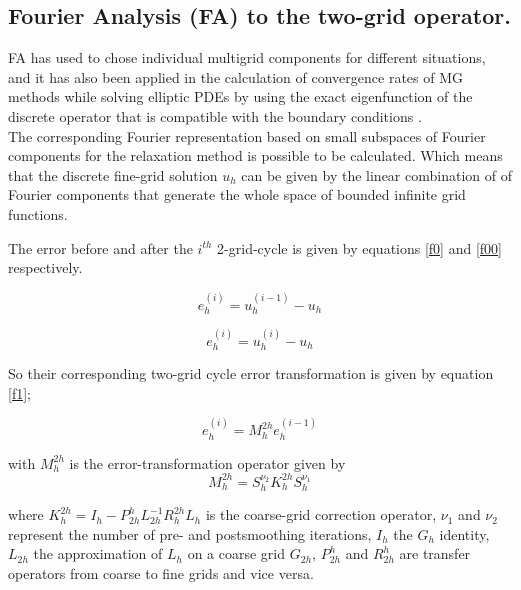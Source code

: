 \documentclass[12pt,a4paper]{article}
\begin{document}
	\subsection{Fourier Analysis (FA) to the two-grid operator.}
	
	FA has used to chose individual multigrid components for different situations, and it has also been applied in the calculation of convergence rates of MG methods while solving elliptic PDEs by using the exact eigenfunction of the discrete operator that is compatible with the boundary conditions \cite{kuo1989two}.\\
	
	\noindent  The corresponding Fourier representation  based on small subspaces of Fourier components for the relaxation method is possible to be calculated. Which means that the discrete fine-grid solution $u_{h}$  can be given by the linear combination of of Fourier components  that generate the whole space of bounded infinite grid functions.
	
	\noindent The error before and after the $i^{th}$ 2-grid-cycle is given by equations \eqref{f0} and \eqref{f00} respectively.
	
	\begin{equation}
		e_{h}^{(i)} = u_{h}^{(i-1)}  - u_{h} 
		\label{f0}
	\end{equation}

	\begin{equation}
	e_{h}^{(i)} = u_{h}^{(i)}  - u_{h} 
	\label{f00}
\end{equation}
	
	\noindent So their corresponding two-grid cycle error transformation is given by equation \eqref{f1};
	
	\begin{equation}
		e_{h}^{(i)} = M_{h}^{2h}e_{h}^{(i-1)}
		\label{f1}
	\end{equation}

	\noindent  with $M_{h}^{2h}$ is the error-transformation operator given by 
	\begin{equation}
	 M_{h}^{2h} = S_{h}^{\nu_{2}}K_{h}^{2h}S_{h}^{\nu_{1}} 
	\label{f2}
	\end{equation}
	
	 \noindent  where $K_{h}^{2h} = I_{h} - P_{2h}^{h}L_{2h}^{-1}R_{h}^{2h}L_{h}$ is the coarse-grid correction operator, $\nu_{1}$ and $\nu_{2}$ represent the number of pre- and postsmoothing iterations, $I_{h}$ the $G_{h}$ identity, $L_{2h}$ the approximation of $L_{h}$ on a coarse grid $G_{2h}$, $P_{2h}^{h}$ and $R_{2h}^{h}$ are transfer operators from coarse to fine grids and vice versa.\\
	 
\end{document}
